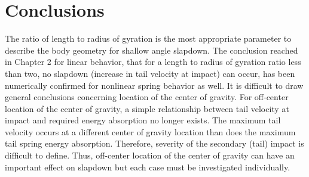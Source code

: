 \section{Conclusions}
The ratio of length to radius of gyration is the most appropriate 
parameter to describe the body geometry for shallow angle 
slapdown.  The conclusion reached in Chapter 2 for linear behavior,
that for a length to radius of gyration ratio less than two, no 
slapdown (increase in tail velocity at impact) can occur, has been
numerically confirmed for nonlinear spring behavior as well.
It is difficult to draw general conclusions concerning location of the 
center of gravity.  For 
off-center location of the center of gravity, a simple relationship
between tail velocity at impact and required energy absorption no 
longer exists.  The maximum tail velocity occurs at a different 
center of gravity location than does the maximum tail spring energy 
absorption.  Therefore, severity of the secondary (tail) impact is 
difficult to define.  Thus, off-center location of the 
center of gravity can have an important effect on slapdown but each
case must be investigated individually.
